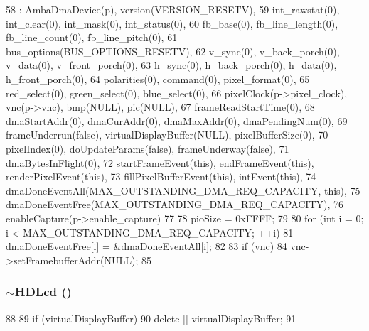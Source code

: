\begin{DoxyCode}
58     : AmbaDmaDevice(p), version(VERSION_RESETV),
59       int_rawstat(0), int_clear(0), int_mask(0), int_status(0),
60       fb_base(0), fb_line_length(0), fb_line_count(0), fb_line_pitch(0),
61       bus_options(BUS_OPTIONS_RESETV),
62       v_sync(0), v_back_porch(0), v_data(0), v_front_porch(0),
63       h_sync(0), h_back_porch(0), h_data(0), h_front_porch(0),
64       polarities(0), command(0), pixel_format(0),
65       red_select(0), green_select(0), blue_select(0),
66       pixelClock(p->pixel_clock), vnc(p->vnc), bmp(NULL), pic(NULL),
67       frameReadStartTime(0),
68       dmaStartAddr(0), dmaCurAddr(0), dmaMaxAddr(0), dmaPendingNum(0),
69       frameUnderrun(false), virtualDisplayBuffer(NULL), pixelBufferSize(0),
70       pixelIndex(0), doUpdateParams(false), frameUnderway(false),
71       dmaBytesInFlight(0),
72       startFrameEvent(this), endFrameEvent(this), renderPixelEvent(this),
73       fillPixelBufferEvent(this), intEvent(this),
74       dmaDoneEventAll(MAX_OUTSTANDING_DMA_REQ_CAPACITY, this),
75       dmaDoneEventFree(MAX_OUTSTANDING_DMA_REQ_CAPACITY),
76       enableCapture(p->enable_capture)
77 {
78     pioSize = 0xFFFF;
79 
80     for (int i = 0; i < MAX_OUTSTANDING_DMA_REQ_CAPACITY; ++i)
81         dmaDoneEventFree[i] = &dmaDoneEventAll[i];
82 
83     if (vnc)
84         vnc->setFramebufferAddr(NULL);
85 }
\end{DoxyCode}
\hypertarget{classHDLcd_af9e41a7cf9baf266c10c60ea6fb4b529}{
\subsubsection[{$\sim$HDLcd}]{\setlength{\rightskip}{0pt plus 5cm}$\sim${\bf HDLcd} ()}}
\label{classHDLcd_af9e41a7cf9baf266c10c60ea6fb4b529}



\begin{DoxyCode}
88 {
89     if (virtualDisplayBuffer)
90         delete [] virtualDisplayBuffer;
91 }
\end{DoxyCode}


